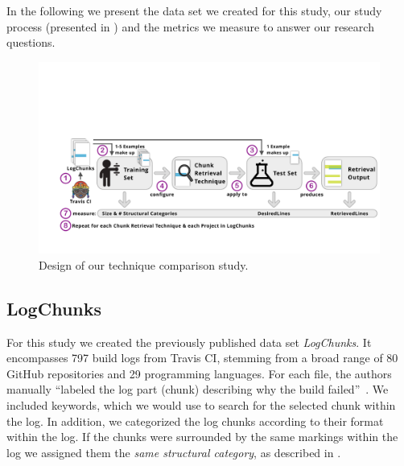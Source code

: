 In the following we present the data set we created for this study,
our study process (presented in ) and the metrics
we measure to answer our research questions.

\begin{figure}[tb]
	\centering
	\includegraphics[width=\textwidth, trim={1.6cm 1.6cm 0.2cm 5.6cm},
  clip]{img/study.pdf}
	\caption{Design of our technique comparison study.}
	\label{fig:study}
\end{figure}

\subsection{LogChunks}
For this study we created the previously published data set
\emph{LogChunks}.
It encompasses 797 build logs from Travis CI,
stemming from a broad range of 80 GitHub repositories and 29
programming languages.
For each file, the authors manually ``labeled
the log part (chunk) describing why the build
failed''~\cite{brandt2020logchunks}.
We included keywords, which we
would use to search for the selected chunk within the log.
In
addition, we categorized the log chunks according to their format
within the log.
If the chunks were surrounded by the same markings
within the log we assigned them the \emph{same structural category},
as described in .

